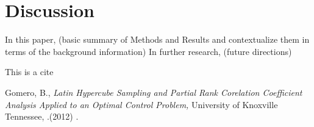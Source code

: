 \documentclass{article}
\begin{document}
\section{Discussion}
In this paper,
(basic summary of Methods and Results and contextualize them in terms of the background information)
In further research, 
(future directions)


This is a cite \cite{one}

\begin{thebibliography}{999}

 Gomero, B., \emph{ Latin Hypercube Sampling and Partial Rank Corelation Coefficient Analysis Applied to an Optimal Control Problem,} University of Knoxville Tennessee, .(2012) .


\end{thebibliography}
\end{document}
